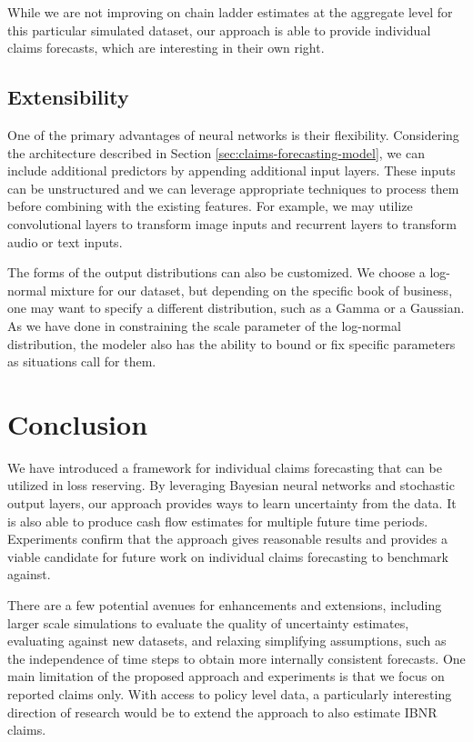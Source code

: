 \documentclass{article}
\begin{document}
While we are not improving on chain ladder estimates at the aggregate level for 
this particular simulated dataset, our approach is able to provide individual 
claims forecasts, which are interesting in their own right.

\subsection{Extensibility}

One of the primary advantages of neural networks is their flexibility. 
Considering the architecture described in Section 
\ref{sec:claims-forecasting-model}, we can include additional predictors by 
appending additional input layers. These inputs can be unstructured and we can 
leverage appropriate techniques to process them before combining with the 
existing features. For example, we may utilize convolutional layers to transform
image inputs and recurrent layers to transform audio or text inputs.

The forms of the output distributions can also be customized. We choose a 
log-normal mixture for our dataset, but depending on the specific book of 
business, one may want to specify a different distribution, such as a Gamma or a
Gaussian. As we have done in constraining the scale parameter of the log-normal 
distribution, the modeler also has the ability to bound or fix specific 
parameters as situations call for them.

\section{Conclusion}

We have introduced a framework for individual claims forecasting that can be 
utilized in loss reserving. By leveraging Bayesian neural networks and 
stochastic output layers, our approach provides ways to learn uncertainty from 
the data. It is also able to produce cash flow estimates for multiple future
time periods. Experiments confirm that the approach gives reasonable results and
provides a viable candidate for future work on individual claims forecasting to 
benchmark against.

There are a few potential avenues for enhancements and extensions, including 
larger scale simulations to evaluate the quality of uncertainty estimates, 
evaluating against new datasets, and relaxing simplifying assumptions, such as 
the independence of time steps to obtain more internally consistent forecasts.
One main limitation of the proposed approach and experiments is that we focus on
reported claims only. With access to policy level data, a particularly interesting 
direction of research would be to extend the approach to also estimate IBNR claims.
\end{document}
